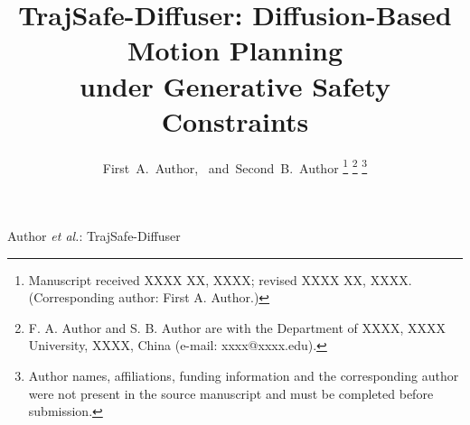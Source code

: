 \documentclass[journal]{IEEEtran}
\begin{document}
\title{TrajSafe-Diffuser: Diffusion-Based Motion Planning\\under Generative Safety Constraints}

\author{First~A.~Author,~
        and~Second~B.~Author%
\thanks{Manuscript received XXXX XX, XXXX; revised XXXX XX, XXXX. (Corresponding author: First A. Author.)}%
\thanks{F. A. Author and S. B. Author are with the Department of XXXX, XXXX University, XXXX, China (e-mail: xxxx@xxxx.edu).}%
\thanks{Author names, affiliations, funding information and the corresponding author were not present in the source manuscript and must be completed before submission.}}

%
{Author \MakeLowercase{\textit{et al.}}: TrajSafe-Diffuser}

\maketitle

\nocite{lavalle2006planning,karaman2011sampling,zucker2013chomp,ho2020ddpm,%
janner2022diffuser,huang2023scenediffuser,carvalho2025mpd,ames2017cbf,%
xiao2025safediffuser,christopher2024projected,liang2025smd,deits2015iris,%
wang2025firi,marcucci2023gcs,liang2026dgd,song2021ddim,chen2023analogbits,%
piegl1997nurbs,peebles2023dit,vaswani2017attention,nocedal2006numerical,%
dosovitskiy2017carla}
\end{document}
